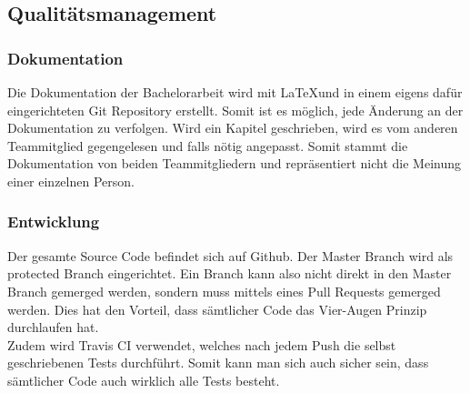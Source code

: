 \subsection{Qualitätsmanagement}

\subsubsection*{Dokumentation}
Die Dokumentation der Bachelorarbeit wird mit \LaTeX und in einem eigens dafür eingerichteten Git Repository erstellt. Somit ist es möglich, jede Änderung an der Dokumentation zu verfolgen. Wird ein Kapitel geschrieben, wird es vom anderen Teammitglied gegengelesen und falls nötig angepasst. Somit stammt die Dokumentation von beiden Teammitgliedern und repräsentiert nicht die Meinung einer einzelnen Person. 


\subsubsection*{Entwicklung}
Der gesamte Source Code befindet sich auf Github. Der Master Branch wird als protected Branch eingerichtet. Ein Branch kann also nicht direkt in den Master Branch gemerged werden, sondern muss mittels eines Pull Requests gemerged werden. Dies hat den Vorteil, dass sämtlicher Code das Vier-Augen Prinzip durchlaufen hat. \\ 
Zudem wird Travis CI verwendet, welches nach jedem Push die selbst geschriebenen Tests durchführt. Somit kann man sich auch sicher sein, dass sämtlicher Code auch wirklich alle Tests besteht.

